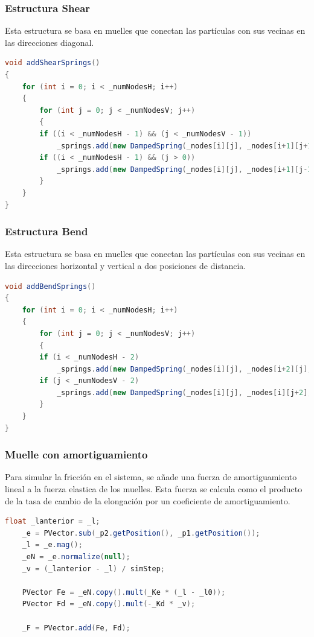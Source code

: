 \documentclass{article}
\begin{document}
\subsubsection{Estructura Shear}\label{sec:estructura-shear}
Esta estructura se basa en muelles que conectan las partículas con sus vecinas en las direcciones diagonal.

\begin{lstlisting}[language=Java, frame=single]
void addShearSprings()
{
    for (int i = 0; i < _numNodesH; i++)
    {
        for (int j = 0; j < _numNodesV; j++)
        {
        if ((i < _numNodesH - 1) && (j < _numNodesV - 1))
            _springs.add(new DampedSpring(_nodes[i][j], _nodes[i+1][j+1], Ke, Kd));
        if ((i < _numNodesH - 1) && (j > 0))
            _springs.add(new DampedSpring(_nodes[i][j], _nodes[i+1][j-1], Ke, Kd));
        }
    }
}
\end{lstlisting}

\subsubsection{Estructura Bend}\label{sec:estructura-bend}
Esta estructura se basa en muelles que conectan las partículas con sus vecinas en las direcciones horizontal y vertical a dos posiciones de distancia.

\begin{lstlisting}[language=Java, frame=single]
void addBendSprings()
{
    for (int i = 0; i < _numNodesH; i++)
    {
        for (int j = 0; j < _numNodesV; j++)
        {
        if (i < _numNodesH - 2)
            _springs.add(new DampedSpring(_nodes[i][j], _nodes[i+2][j], Ke, Kd));
        if (j < _numNodesV - 2)
            _springs.add(new DampedSpring(_nodes[i][j], _nodes[i][j+2], Ke, Kd));
        }
    }
}
\end{lstlisting}

\subsubsection{Muelle con amortiguamiento}\label{sec:muelle-amortiguado}

Para simular la fricción en el sistema, se añade una fuerza de amortiguamiento lineal a la fuerza elastica de los muelles. Esta fuerza se calcula como el producto de la tasa de cambio de la elongación por un coeficiente de amortiguamiento.

\begin{lstlisting}[language=Java, frame=single]
    float _lanterior = _l;
    _e = PVector.sub(_p2.getPosition(), _p1.getPosition());
    _l = _e.mag();
    _eN = _e.normalize(null);
    _v = (_lanterior - _l) / simStep;

    PVector Fe = _eN.copy().mult(_Ke * (_l - _l0));
    PVector Fd = _eN.copy().mult(-_Kd * _v);

    _F = PVector.add(Fe, Fd);
\end{lstlisting}
\end{document}
